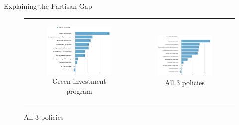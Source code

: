 \begin{frame}{Explaining the Partisan Gap}
\begin{figure}[h!]
	\caption{Gelbach decomposition of the partisan gap in support for:}
	\setlength\extrarowheight{-1pt}
\begin{center}
	\begin{tabular}{cc}
		\begin{subfigure}{0.48\textwidth}
		\caption{Green investment program}
			\includegraphics[width=\textwidth]{../../figures/Gelbach/gelbach_right_investments_D2SD}
		\end{subfigure}&
		\begin{subfigure}{0.48\textwidth}
		\caption{All 3 policies}
			\includegraphics[width=\textwidth]{../../figures/Gelbach/gelbach_right_main_policies_D2SD}
		\end{subfigure}\\
	\end{tabular}
\end{center}
\end{figure}
\end{frame}


